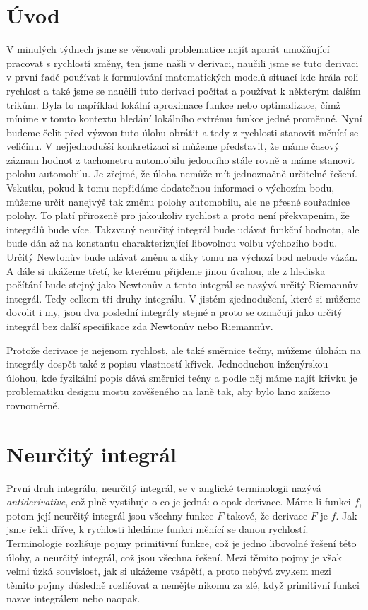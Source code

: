 \documentclass[12pt]{article}
\begin{document}
\section*{Úvod}

V minulých týdnech jsme se věnovali problematice najít aparát umožňující pracovat s rychlostí změny, ten jsme našli v derivaci, naučili jsme se tuto derivaci v první řadě používat k formulování matematických modelů situací kde hrála roli rychlost a také jsme se naučili tuto derivaci počítat a používat k některým dalším trikům. Byla to například lokální aproximace funkce nebo optimalizace, čímž míníme v tomto kontextu hledání lokálního extrému funkce jedné proměnné. Nyní budeme čelit před výzvou tuto úlohu obrátit a tedy z rychlosti stanovit měnící se veličinu. V nejjednodušší konkretizaci si můžeme představit, že máme časový záznam hodnot z tachometru automobilu jedoucího stále rovně a máme stanovit polohu automobilu. Je zřejmé, že úloha nemůže mít jednoznačně určitelné řešení. Vskutku, pokud k tomu nepřidáme dodatečnou informaci o výchozím bodu, můžeme určit nanejvýš tak změnu polohy automobilu, ale ne přesné souřadnice polohy. To platí přirozeně pro jakoukoliv rychlost a proto není překvapením, že integrálů bude více. Takzvaný neurčitý integrál bude udávat funkční hodnotu, ale bude dán až na konstantu charakterizující libovolnou volbu výchozího bodu. Určitý Newtonův bude udávat změnu a díky tomu na výchozí bod nebude vázán. A dále si ukážeme třetí, ke kterému přijdeme jinou úvahou, ale z hlediska počítání bude stejný jako Newtonův a tento integrál se nazývá určitý Riemannův integrál. Tedy celkem tři druhy integrálu. V jistém zjednodušení, které si můžeme dovolit i my, jsou dva poslední integrály stejné a proto se označují jako určitý integrál bez další specifikace zda Newtonův nebo Riemannův.

Protože derivace je nejenom rychlost, ale také směrnice tečny, můžeme  úlohám na integrály dospět také z popisu vlastností křivek. Jednoduchou inženýrskou úlohou, kde fyzikální popis dává směrnici tečny a podle něj máme najít křivku je problematiku designu mostu zavěšeného na laně tak, aby bylo lano zaíženo rovnoměrně.


\section*{Neurčitý integrál}

První druh integrálu, neurčitý integrál, se v anglické terminologii nazývá \textit{antiderivative}, což plně vystihuje o co je jedná: o opak derivace. Máme-li funkci $f$, potom její neurčitý integrál jsou všechny funkce $F$ takové, že derivace $F$ je $f$. Jak jsme řekli dříve, k rychlosti hledáme funkci měnící se danou rychlostí. Terminologie rozlišuje pojmy primitivní funkce, což je jedno libovolné řešení této úlohy, a neurčitý integrál, což jsou všechna řešení. Mezi těmito pojmy je však velmi úzká souvislost, jak si ukážeme vzápětí, a proto nebývá zvykem mezi těmito pojmy důsledně rozlišovat a nemějte nikomu za zlé, když primitivní funkci nazve integrálem nebo naopak. 
\end{document}
